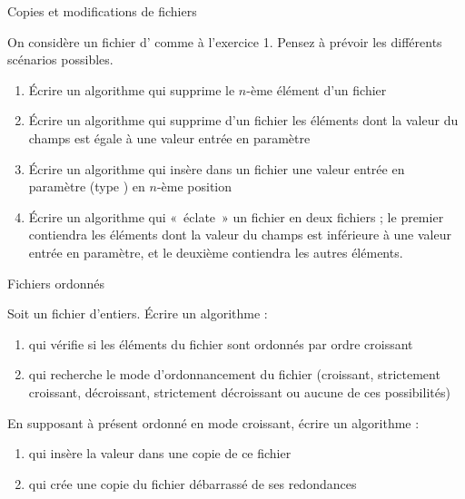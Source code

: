 \begin{Exercice}{Copies et modifications de fichiers}
	
	On considère un fichier d' comme à l'exercice 1. 
	Pensez à prévoir les différents scénarios possibles.
	
	\begin{enumerate}[label=\alph*)]
		\item 
			Écrire un algorithme qui supprime le $n$-ème élément d’un
			fichier
		\item 
			Écrire un algorithme qui supprime d’un fichier les éléments dont la
			valeur du champs  est égale à une valeur entrée en paramètre 
		\item 
			Écrire un algorithme qui insère dans un fichier une valeur entrée en
			paramètre (type ) en $n$-ème position
		\item 
			Écrire un algorithme qui «~éclate~» un fichier en deux fichiers ; le
			premier contiendra les éléments dont la valeur du champs  est
			inférieure à une valeur entrée en paramètre, et le deuxième contiendra
			les autres éléments.
	\end{enumerate}
\end{Exercice}

\begin{Exercice}{Fichiers ordonnés}

	Soit  un fichier d’entiers. Écrire un algorithme :

	\begin{enumerate}[label=\alph*)]
		\item 
			qui vérifie si les éléments du fichier sont ordonnés par ordre
			croissant
		\item 
			qui recherche le mode d’ordonnancement du fichier (croissant,
			strictement croissant, décroissant, strictement décroissant ou aucune
			de ces possibilités)
	\end{enumerate}
	
	En supposant à présent  ordonné en mode croissant, écrire un
	algorithme :

	\begin{enumerate}[label=\alph*)]
		\item 
			qui insère la valeur  dans une copie de ce fichier
		\item 
			qui crée une copie du fichier débarrassé de ses redondances
	\end{enumerate}
\end{Exercice}


